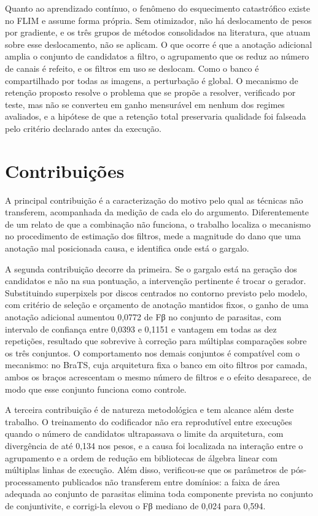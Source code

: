 Quanto ao aprendizado contínuo, o fenômeno do esquecimento catastrófico existe no \ac{FLIM} e assume forma própria. Sem otimizador, não há deslocamento de pesos por gradiente, e os três grupos de métodos consolidados na literatura, que atuam sobre esse deslocamento, não se aplicam. O que ocorre é que a anotação adicional amplia o conjunto de candidatos a filtro, o agrupamento que os reduz ao número de canais é refeito, e os filtros em uso se deslocam. Como o banco é compartilhado por todas as imagens, a perturbação é global. O mecanismo de retenção proposto resolve o problema que se propõe a resolver, verificado por teste, mas não se converteu em ganho mensurável em nenhum dos regimes avaliados, e a hipótese de que a retenção total preservaria qualidade foi falseada pelo critério declarado antes da execução.

\section{Contribuições}

A principal contribuição é a caracterização do motivo pelo qual as técnicas não transferem, acompanhada da medição de cada elo do argumento. Diferentemente de um relato de que a combinação não funciona, o trabalho localiza o mecanismo no procedimento de estimação dos filtros, mede a magnitude do dano que uma anotação mal posicionada causa, e identifica onde está o gargalo.

A segunda contribuição decorre da primeira. Se o gargalo está na geração dos candidatos e não na sua pontuação, a intervenção pertinente é trocar o gerador. Substituindo superpixels por discos centrados no contorno previsto pelo modelo, com critério de seleção e orçamento de anotação mantidos fixos, o ganho de uma anotação adicional aumentou 0,0772 de Fβ no conjunto de parasitas, com intervalo de confiança entre 0,0393 e 0,1151 e vantagem em todas as dez repetições, resultado que sobrevive à correção para múltiplas comparações sobre os três conjuntos. O comportamento nos demais conjuntos é compatível com o mecanismo: no BraTS, cuja arquitetura fixa o banco em oito filtros por camada, ambos os braços acrescentam o mesmo número de filtros e o efeito desaparece, de modo que esse conjunto funciona como controle.

A terceira contribuição é de natureza metodológica e tem alcance além deste trabalho. O treinamento do codificador não era reprodutível entre execuções quando o número de candidatos ultrapassava o limite da arquitetura, com divergência de até 0,134 nos pesos, e a causa foi localizada na interação entre o agrupamento e a ordem de redução em bibliotecas de álgebra linear com múltiplas linhas de execução. Além disso, verificou-se que os parâmetros de pós-processamento publicados não transferem entre domínios: a faixa de área adequada ao conjunto de parasitas elimina toda componente prevista no conjunto de conjuntivite, e corrigi-la elevou o Fβ mediano de 0,024 para 0,594.

